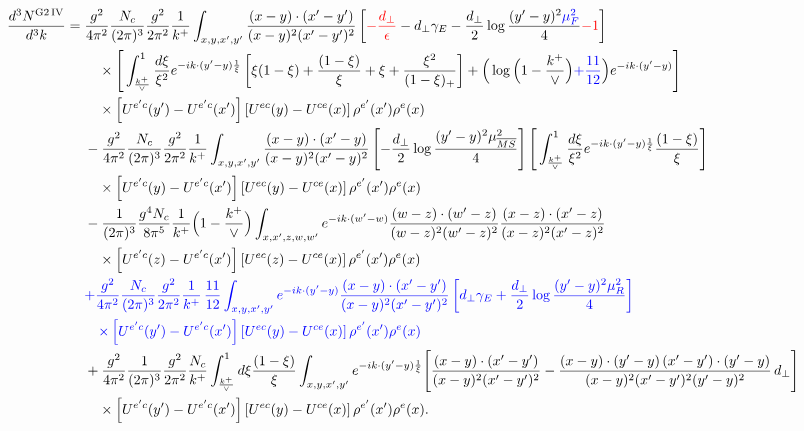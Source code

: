 \documentclass[10pt]{article}
\numberwithin{equation}{section}
\newcommand{\new}[1]{{\color{blue}#1}}
\newcommand{\old}[1]{{\color{red}#1}}
\begin{document}
\begin{align}
\frac{d^{3}N^{\rm G2\,IV}}{d^{3}k}={}&\frac{g^{2}}{4\pi^{2}}\frac{N_{c}}{(2\pi)^{3}}\frac{g^{2}}{2\pi^{2}}\frac{1}{k^{+}}\int_{x,y,x',y'}\frac{(x-y)\cdot(x'-y')}{(x-y)^{2}(x'-y')^{2}}\left[\old{-\frac{d_{\perp}}{\epsilon}}-d_{\perp}\gamma_{E}-\frac{d_{\perp}}{2}\log\frac{(y'-y)^{2}\new{\mu_{F}^{2}}}{4}\old{-1}\right]\notag\\
&\quad\times\Bigg[\int_{\frac{k^{+}}{\vee}}^{1}\frac{d\xi}{\xi^{2}}e^{-ik\cdot(y'-y)\frac{1}{\xi}}\left[\xi(1-\xi)+\frac{(1-\xi)}{\xi}+\xi+\frac{\xi^{2}}{(1-\xi)_{+}}\right]+\Big(\log\Big(1-\frac{k^{+}}{\vee}\Big)\new{+\frac{11}{12}}\Big)e^{-ik\cdot(y'-y)}\Bigg]\notag\\
&\quad\times\left[U^{e'c}(y')-U^{e'c}(x')\right]\left[U^{ec}(y)-U^{ce}(x)\right]\rho^{e'}(x')\rho^{e}(x)\notag\\
&-\frac{g^{2}}{4\pi^{2}}\frac{N_{c}}{(2\pi)^{3}}\frac{g^{2}}{2\pi^{2}}\frac{1}{k^{+}}\int_{x,y,x',y'}\frac{(x-y)\cdot(x'-y)}{(x-y)^{2}(x'-y)^{2}}\left[-\frac{d_{\perp}}{2}\log\frac{(y'-y)^{2}\mu^{2}_{\overline{MS}}}{4}\right]\Bigg[\int_{\frac{k^{+}}{\vee}}^{1}\frac{d\xi}{\xi^{2}}e^{-ik\cdot(y'-y)\frac{1}{\xi}}\frac{(1-\xi)}{\xi}\Bigg]\notag\\
&\quad\times\left[U^{e'c}(y)-U^{e'c}(x')\right]\left[U^{ec}(y)-U^{ce}(x)\right]\rho^{e'}(x')\rho^{e}(x)\notag\\
&-\frac{1}{(2\pi)^{3}}\frac{g^{4}N_{c}}{8\pi^{5}}\frac{1}{k^{+}}\Big(1-\frac{k^{+}}{\vee}\Big)\int_{x,x',z,w,w'}e^{-ik\cdot(w'-w)}\frac{(w-z)\cdot(w'-z)}{(w-z)^{2}(w'-z)^{2}}\frac{(x-z)\cdot(x'-z)}{(x-z)^{2}(x'-z)^{2}}\notag\\
&\quad\times\left[U^{e'c}(z)-U^{e'c}(x')\right]\left[U^{ec}(z)-U^{ce}(x)\right]\rho^{e'}(x')\rho^{e}(x)\notag\\
&\new{+\frac{g^{2}}{4\pi^{2}}\frac{N_{c}}{(2\pi)^{3}}\frac{g^{2}}{2\pi^{2}}\frac{1}{k^{+}}\,\frac{11}{12}\int_{x,y,x',y'}e^{-ik\cdot(y'-y)}\frac{(x-y)\cdot(x'-y')}{(x-y)^{2}(x'-y')^{2}}\left[d_{\perp}\gamma_{E}+\frac{d_{\perp}}{2}\log\frac{(y'-y)^{2}\mu_{R}^{2}}{4}\right]}\notag\\
&\quad\new{\times\left[U^{e'c}(y')-U^{e'c}(x')\right]\left[U^{ec}(y)-U^{ce}(x)\right]\rho^{e'}(x')\rho^{e}(x)}\notag\\
&+\frac{g^{2}}{4\pi^{2}}\frac{1}{(2\pi)^{3}}\frac{g^{2}}{2\pi^{2}}\frac{N_{c}}{k^{+}}\int_{\frac{k^{+}}{\vee}}^{1}d\xi\frac{(1-\xi)}{\xi}\int_{x,y,x',y'}e^{-ik\cdot(y'-y)\frac{1}{\xi}}\Bigg[\frac{(x-y)\cdot(x'-y')}{(x-y)^{2}(x'-y')^{2}}-\frac{(x-y)\cdot(y'-y)\,(x'-y')\cdot(y'-y)}{(x-y)^{2}(x'-y')^{2}(y'-y)^{2}}\,d_{\perp}\Bigg]\notag\\
&\quad\times\left[U^{e'c}(y')-U^{e'c}(x')\right]\left[U^{ec}(y)-U^{ce}(x)\right]\rho^{e'}(x')\rho^{e}(x).\label{eq:final2}
\end{align}
\end{document}
